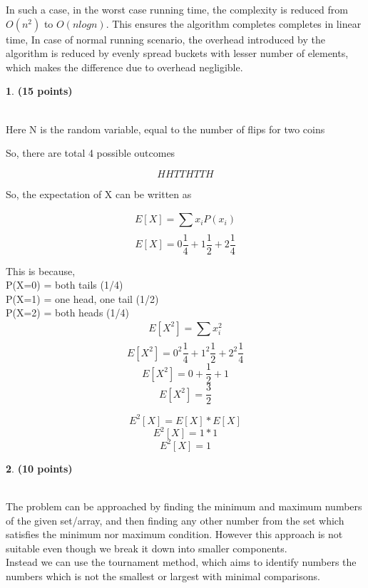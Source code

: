\documentclass[11pt]{article}
\theoremstyle{definition}
\newtheorem{prob}{}
\newcommand{\solution}{\medskip\noindent{\color{DarkBlue}\textbf{Solution:}}}
\begin{document}
In such a case, in the worst case running time, the complexity is reduced from $O(n^2)$ to $O(nlogn)$. This ensures the algorithm completes completes in linear time,
In case of normal running scenario, the overhead introduced by the algorithm is reduced by evenly spread buckets with lesser number of elements, which makes the difference
due to overhead negligible.

\begin{prob} \textbf{(15 points)}
\end{prob}

\solution\\

Here N is the random variable, equal to the number of flips for two coins

So, there are total 4 possible outcomes

\[ HH TT HT TH\]

So, the expectation of X can be written as

\[ E[X] = \sum_{}^{} x_i P(x_i) \]
\[ E[X] = 0\frac{1}{4} + 1\frac{1}{2} + 2\frac{1}{4} \]

This is because, \\

P(X=0) = both tails (1/4) \\

P(X=1) = one head, one tail (1/2) \\

P(X=2) = both heads (1/4) \\

\[ E[X^2] = \sum_{}^{} x_i^2 \]
\[ E[X^2] = 0^2\frac{1}{4} + 1^2\frac{1}{2} + 2^2\frac{1}{4} \]
\[ E[X^2] = 0 + \frac{1}{2} + 1 \]
\[ E[X^2] = \frac{3}{2} \]

\[ E^2[X] = E[X] * E[X] \]
\[ E^2[X] = 1 * 1 \]
\[ E^2[X] = 1\]

\begin{prob} \textbf{(10 points)}
\end{prob}

\solution \\

The problem can be approached by finding the minimum and maximum numbers of the given set/array, and then finding any other number
from the set which satisfies the minimum nor maximum condition. However this approach is not suitable even though we break it down
into smaller components.\\

Instead we can use the tournament method, which aims to identify numbers the numbers which is not the smallest or largest with minimal
comparisons.
\end{document}
